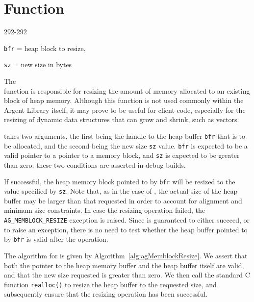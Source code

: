 %
%
\section{Function \agMemblockResize}
  {292-292}{\texttt{bfr} = heap block to resize,\par\texttt{sz} = new size in
  bytes}

The \agMemblockResize{} \\ function is responsible for resizing the amount of 
memory allocated to an existing block of heap memory. Although this function is 
not used commonly within the Argent Library itself, it may prove to be useful 
for client code, especially for the resizing of dynamic data structures that can
grow and shrink, such as vectors.

\agMemblockResize{} takes two arguments, the first being the handle to the heap
buffer \texttt{bfr} that is to be allocated, and the second being the new size 
\texttt{sz} value. \texttt{bfr} is expected to be a valid pointer to a pointer 
to a memory block, and \texttt{sz} is expected to be greater than zero; these 
two conditions are asserted in debug builds.


If successful, the heap memory block pointed to by \texttt{bfr} will be resized 
to the value specified by \texttt{sz}. Note that, as in the case of 
\agMemblockNew, the actual size of the heap buffer may be larger than that
requested in order to account for alignment and minimum size constraints. In
case the resizing operation failed, the \texttt{AG\_MEMBLOCK\_RESIZE} exception 
is raised. Since \agMemblockResize{} is guaranteed to either succeed, or to raise
an exception, there is no need to test whether the heap buffer pointed to by 
\texttt{bfr} is valid after the operation.

The algorithm for \agMemblockResize{} is given by Algorithm\ 
\ref{alg:agMemblockResize}. We assert that both the pointer to the heap memory 
buffer and the heap buffer itself are valid, and that the new size requested is 
greater than zero. We then call the standard C function \texttt{realloc()} to 
resize the heap buffer to the requested size, and subsequently ensure that the 
resizing operation has been successful.

